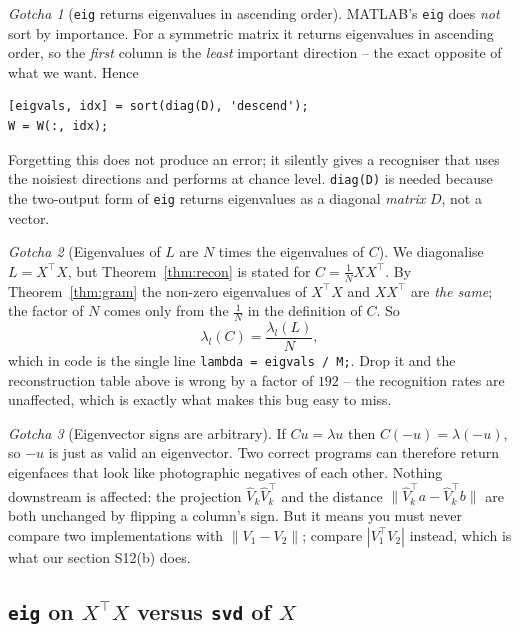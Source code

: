 \documentclass[11pt]{article}
\theoremstyle{definition}
\theoremstyle{remark}
\newtheorem*{gotcha}{Gotcha}
\begin{document}
\begin{gotcha}[\texttt{eig} returns eigenvalues in ascending order]
MATLAB's \texttt{eig} does \emph{not} sort by importance. For a symmetric matrix it
returns eigenvalues in ascending order, so the \emph{first} column is the
\emph{least} important direction -- the exact opposite of what we want. Hence
\begin{lstlisting}
[eigvals, idx] = sort(diag(D), 'descend');
W = W(:, idx);
\end{lstlisting}
Forgetting this does not produce an error; it silently gives a recogniser that uses
the noisiest directions and performs at chance level. \texttt{diag(D)} is needed
because the two-output form of \texttt{eig} returns eigenvalues as a diagonal
\emph{matrix} $D$, not a vector.
\end{gotcha}

\begin{gotcha}[Eigenvalues of $L$ are $N$ times the eigenvalues of $C$]
We diagonalise $L=X^{\!\top}\!X$, but Theorem~\ref{thm:recon} is stated for
$C=\frac1N XX^{\!\top}$. By Theorem~\ref{thm:gram} the non-zero eigenvalues of
$X^{\!\top}\!X$ and $XX^{\!\top}$ are \emph{the same}; the factor of $N$ comes only from the
$\frac1N$ in the definition of $C$. So
\[
  \lambda_l(C) = \frac{\lambda_l(L)}{N},
\]
which in code is the single line \texttt{lambda = eigvals / M;}. Drop it and the
reconstruction table above is wrong by a factor of $192$ -- the recognition rates
are unaffected, which is exactly what makes this bug easy to miss.
\end{gotcha}

\begin{gotcha}[Eigenvector signs are arbitrary]
If $Cu=\lambda u$ then $C(-u)=\lambda(-u)$, so $-u$ is just as valid an
eigenvector. Two correct programs can therefore return eigenfaces that look like
photographic negatives of each other. Nothing downstream is affected: the
projection $\hat{V}_k\hat{V}_k^{\!\top}$ and the distance $\|\hat{V}_k^{\!\top} a - \hat{V}_k^{\!\top} b\|$ are both
unchanged by flipping a column's sign. But it means you must never compare two
implementations with $\|V_1-V_2\|$; compare $|V_1^{\!\top} V_2|$ instead, which is what
our section S12(b) does.
\end{gotcha}

\subsection{\texttt{eig} on \texorpdfstring{$X^{\!\top}\!X$}{A'A} versus \texttt{svd} of \texorpdfstring{$X$}{A}}
\label{sec:eigvssvd}
\end{document}
